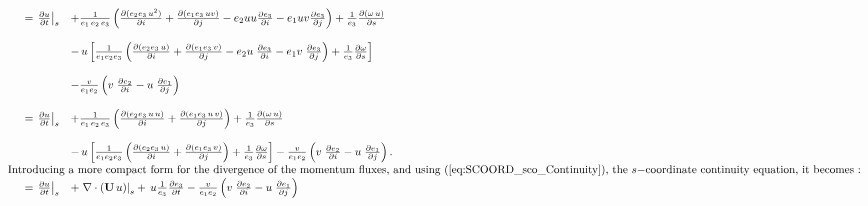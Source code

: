 \documentclass[../main/NEMO_manual]{subfiles}
\begin{document}
\begin{align*}
  {
  \begin{array}{*{20}l}
    &= \left. {\frac{\partial u }{\partial t}} \right|_s
    &+ \frac{1}{e_1\,e_2\,e_3}  \left(  \frac{\partial( e_2 e_3 \,u^2 )}{\partial i}
      + \frac{\partial( e_1 e_3 \,u v )}{\partial j}
      -  e_2 u u \frac{\partial e_3}{\partial i}
      -  e_1 u v \frac{\partial e_3 }{\partial j}    \right)
      + \frac{1}{e_3} \frac{\partial \left( {\omega\,u} \right)}{\partial s} \\ \\
    && - \,u \left[  \frac{1}{e_1 e_2 e_3} \left(   \frac{\partial(e_2 e_3 \, u)}{\partial i}
       + \frac{\partial(e_1 e_3 \, v)}{\partial j}
       -  e_2 u \;\frac{\partial e_3 }{\partial i}
       -  e_1 v \;\frac{\partial e_3 }{\partial j}   \right)
       + \frac{1}{e_3}        \frac{\partial \omega}{\partial s}                       \right] \\ \\
    && - \frac{v}{e_1 e_2 }\left( 	v  \;\frac{\partial e_2 }{\partial i}
       -u  \;\frac{\partial e_1 }{\partial j} 	\right) \\ \\
    &= \left. {\frac{\partial u }{\partial t}} \right|_s
    &+ \frac{1}{e_1\,e_2\,e_3}  \left(  \frac{\partial( e_2 e_3 \,u\,u )}{\partial i}
      + \frac{\partial( e_1 e_3 \,u\,v )}{\partial j}    \right)
      + \frac{1}{e_3 } \frac{\partial \left( {\omega\,u} \right)}{\partial s} \\ \\
    && - \,u \left[  \frac{1}{e_1 e_2 e_3} \left(   \frac{\partial(e_2 e_3 \, u)}{\partial i}
       + \frac{\partial(e_1 e_3 \, v)}{\partial j}  \right)
       + \frac{1}{e_3}        \frac{\partial \omega}{\partial s}                       \right]
       - \frac{v}{e_1 e_2 }\left( 	v   \;\frac{\partial e_2 }{\partial i}
       -u   \;\frac{\partial e_1 }{\partial j} 	\right)     .             \\
    \intertext {Introducing a more compact form for the divergence of the momentum fluxes,
    and using (\autoref{eq:SCOORD_sco_Continuity}), the $s-$coordinate continuity equation,
    it becomes : }
    &= \left. {\frac{\partial u }{\partial t}} \right|_s
    &+ \left.  \nabla \cdot \left(   {{\mathrm {\mathbf U}}\,u}   \right)    \right|_s
      + \,u \frac{1}{e_3 } \frac{\partial e_3}{\partial t}
      - \frac{v}{e_1 e_2 }\left(    v  \;\frac{\partial e_2 }{\partial i}
      -u  \;\frac{\partial e_1 }{\partial j} 	\right)
    \\
  \end{array}
  }
\end{align*}
\end{document}
